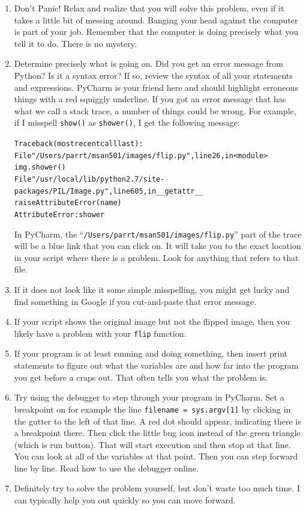 \documentclass[titlepage]{tufte-book}
\newcounter{problem}
\begin{document}
\begin{enumerate}
\item Don't Panic! Relax and realize that you will solve this problem, even if it takes a little bit of messing around. Banging your head against the computer is part of your job. Remember that the computer is doing precisely what you tell it to do. There is no mystery.
\item  Determine precisely what is going on. Did you get an error message from Python?  Is it a syntax error? If so, review the syntax of all your statements and expressions. PyCharm is your friend here and should highlight erroneous things with a red squiggly underline. If you got an error message that has what we call a stack trace, a number of things could be wrong. For example, if I misspell {\tt show()} as {\tt shower()}, I get the following message:
\begin{alltt}\small
Traceback (most recent call last):
  File "/Users/parrt/msan501/images/flip.py", line 26, in <module>
    img.shower()
  File "/usr/local/lib/python2.7/site-packages/PIL/Image.py", line 605, in __getattr__
    raise AttributeError(name)
AttributeError: shower
\end{alltt}
In PyCharm, the ``{\tt /Users/parrt/msan501/images/flip.py}'' part of the trace will be a blue link that you can click on. It will take you to the exact location in your script where there is a problem. Look for anything that refers to that file.
\item If it does not look like it some simple misspelling, you might get lucky and find something in Google if you cut-and-paste that error message.
\item If your script shows the original image but not the flipped image, then you likely have a problem with your {\tt flip} function.
\item If your program is at least running and doing something, then insert print statements to figure out what the variables are and how far into the program you get before a craps out. That often tells you what the problem is.
\item Try using the debugger to step through your program in PyCharm. Set a breakpoint on for example the line {\tt filename = sys.argv[1]} by clicking in the gutter to the left of that line.  A red dot should appear, indicating there is a breakpoint there. Then click the little bug icon instead of the green triangle (which is run button). That will start execution and then stop at that line. You can look at all of the variables at that point. Then you can step forward line by line. Read how to use the debugger online.
\item  Definitely try to solve the problem yourself, but don't waste too much time. I can typically help you out quickly so you can move forward.
\end{enumerate}
\end{document}
